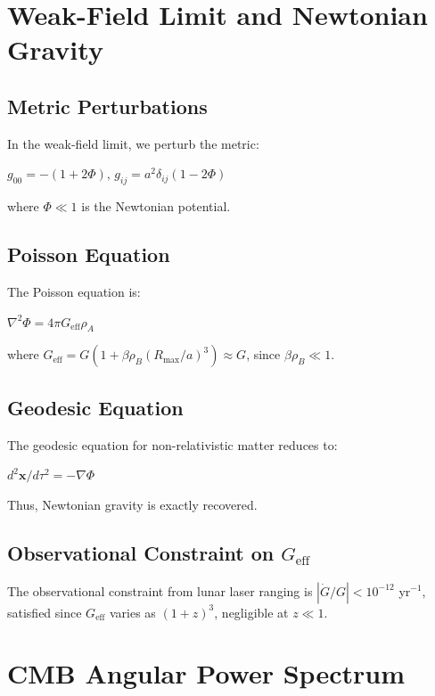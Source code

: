 \documentclass[10pt,twocolumn]{article}
\theoremstyle{definition}
\newcommand{\Rmax}{R_{\max}}
\newcommand{\rhoA}{\rho_{A}}
\newcommand{\rhoB}{\rho_{B}}
\begin{document}
\section{Weak-Field Limit and Newtonian Gravity}
\label{sec:newtonian}

\subsection{Metric Perturbations}

In the weak-field limit, we perturb the metric:

\( g_{00} = - (1 + 2 \Phi) \), \( g_{ij} = a^{2} \delta_{ij} (1 - 2 \Phi) \)

where \( \Phi \ll 1 \) is the Newtonian potential.

\subsection{Poisson Equation}

The Poisson equation is:

\( \nabla^{2} \Phi = 4 \pi G_{\mathrm{eff}} \rhoA \)

where \( G_{\mathrm{eff}} = G (1 + \beta \rhoB (\Rmax / a)^{3}) \approx G \), since \( \beta \rhoB \ll 1 \).

\subsection{Geodesic Equation}

The geodesic equation for non-relativistic matter reduces to:

\( d^{2} \mathbf{x} / d\tau^{2} = - \nabla \Phi \)

Thus, Newtonian gravity is exactly recovered.

\subsection{Observational Constraint on \( G_{\mathrm{eff}} \)}

The observational constraint from lunar laser ranging \citep{Hofmann2018} is \( |\dot{G} / G| < 10^{-12} \) yr\( ^{-1} \), satisfied since \( G_{\mathrm{eff}} \) varies as \( (1 + z)^{3} \), negligible at \( z \ll 1 \).

\section{CMB Angular Power Spectrum}
\label{sec:cmb}
\end{document}
